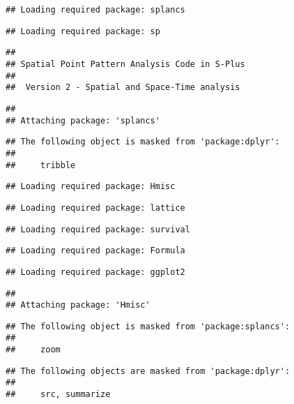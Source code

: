 \documentclass[]{article}
\begin{document}
\begin{verbatim}
## Loading required package: splancs
\end{verbatim}

\begin{verbatim}
## Loading required package: sp
\end{verbatim}

\begin{verbatim}
## 
## Spatial Point Pattern Analysis Code in S-Plus
##  
##  Version 2 - Spatial and Space-Time analysis
\end{verbatim}

\begin{verbatim}
## 
## Attaching package: 'splancs'
\end{verbatim}

\begin{verbatim}
## The following object is masked from 'package:dplyr':
## 
##     tribble
\end{verbatim}

\begin{verbatim}
## Loading required package: Hmisc
\end{verbatim}

\begin{verbatim}
## Loading required package: lattice
\end{verbatim}

\begin{verbatim}
## Loading required package: survival
\end{verbatim}

\begin{verbatim}
## Loading required package: Formula
\end{verbatim}

\begin{verbatim}
## Loading required package: ggplot2
\end{verbatim}

\begin{verbatim}
## 
## Attaching package: 'Hmisc'
\end{verbatim}

\begin{verbatim}
## The following object is masked from 'package:splancs':
## 
##     zoom
\end{verbatim}

\begin{verbatim}
## The following objects are masked from 'package:dplyr':
## 
##     src, summarize
\end{verbatim}
\end{document}
